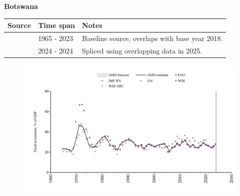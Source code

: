 \documentclass[12pt,a4paper,landscape]{article}
\begin{document}
\begin{adjustbox}{max totalsize={\paperwidth}{\paperheight},center}
\begin{minipage}[t][\textheight][t]{\textwidth}
\vspace*{0.5cm}
{}
\begin{center}
{\Large\bfseries Botswana}
\end{center}
\vspace{0.5cm}
\begin{table}[H]
\centering
\small
\begin{tabular}{|l|l|l|}
\hline
\textbf{Source} & \textbf{Time span} & \textbf{Notes} \\
\hline
\rowcolor{white}\cite{WDI}& 1965 - 2023 &Baseline source, overlaps with base year 2018.\\
\rowcolor{lightgray}\cite{IMF_IFS}& 2024 - 2024 &Spliced using overlapping data in 2025.\\
\hline
\end{tabular}
\end{table}
\begin{figure}[H]
\centering
\includegraphics[width=\textwidth,height=0.6\textheight,keepaspectratio]{graphs/BWA_finv_GDP.pdf}
\end{figure}
\end{minipage}
\end{adjustbox}
\end{document}

